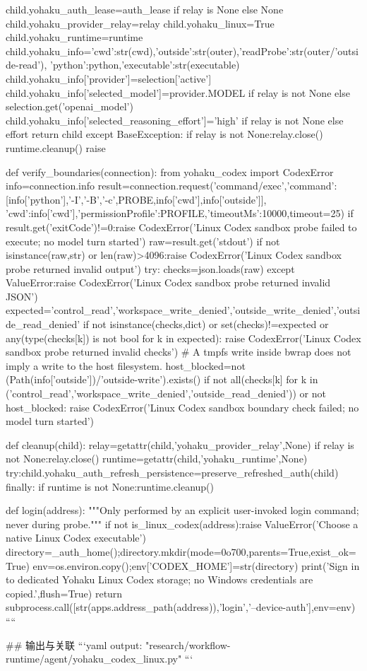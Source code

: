         child.yohaku_auth_lease=auth_lease if relay is None else None
        child.yohaku_provider_relay=relay
        child.yohaku_linux=True
        child.yohaku_runtime=runtime
        child.yohaku_info={'cwd':str(cwd),'outside':str(outer),'readProbe':str(outer/'outside-read'),
                           'python':python,'executable':str(executable)}
        child.yohaku_info['provider']=selection['active']
        child.yohaku_info['selected_model']=provider.MODEL if relay is not None else selection.get('openai_model')
        child.yohaku_info['selected_reasoning_effort']='high' if relay is not None else effort
        return child
    except BaseException:
        if relay is not None:relay.close()
        runtime.cleanup()
        raise


def verify_boundaries(connection):
    from yohaku_codex import CodexError
    info=connection.info
    result=connection.request('command/exec',{'command':[info['python'],'-I','-B','-c',PROBE,info['cwd'],info['outside']],
        'cwd':info['cwd'],'permissionProfile':PROFILE,'timeoutMs':10000},timeout=25)
    if result.get('exitCode')!=0:raise CodexError('Linux Codex sandbox probe failed to execute; no model turn started')
    raw=result.get('stdout')
    if not isinstance(raw,str) or len(raw)>4096:raise CodexError('Linux Codex sandbox probe returned invalid output')
    try:
        checks=json.loads(raw)
    except ValueError:raise CodexError('Linux Codex sandbox probe returned invalid JSON')
    expected={'control_read','workspace_write_denied','outside_write_denied','outside_read_denied'}
    if not isinstance(checks,dict) or set(checks)!=expected or any(type(checks[k]) is not bool for k in expected):
        raise CodexError('Linux Codex sandbox probe returned invalid checks')
    # A tmpfs write inside bwrap does not imply a write to the host filesystem.
    host_blocked=not (Path(info['outside'])/'outside-write').exists()
    if not all(checks[k] for k in ('control_read','workspace_write_denied','outside_read_denied')) or not host_blocked:
        raise CodexError('Linux Codex sandbox boundary check failed; no model turn started')


def cleanup(child):
    relay=getattr(child,'yohaku_provider_relay',None)
    if relay is not None:relay.close()
    runtime=getattr(child,'yohaku_runtime',None)
    try:child.yohaku_auth_refresh_persistence=preserve_refreshed_auth(child)
    finally:
        if runtime is not None:runtime.cleanup()


def login(address):
    """Only performed by an explicit user-invoked login command; never during probe."""
    if not is_linux_codex(address):raise ValueError('Choose a native Linux Codex executable')
    directory=_auth_home();directory.mkdir(mode=0o700,parents=True,exist_ok=True)
    env=os.environ.copy();env['CODEX_HOME']=str(directory)
    print('Sign in to dedicated Yohaku Linux Codex storage; no Windows credentials are copied.',flush=True)
    return subprocess.call([str(apps.address_path(address)),'login','--device-auth'],env=env)
````

## 输出与关联
```yaml
output: "research/workflow-runtime/agent/yohaku_codex_linux.py"
```
